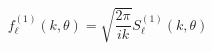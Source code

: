\begin{equation}
f_{\ell}^{(1)} (k, \theta) = \sqrt{\frac{2\pi}{ik}} S_{\ell}^{(1)}
(k, \theta)
\end{equation}

